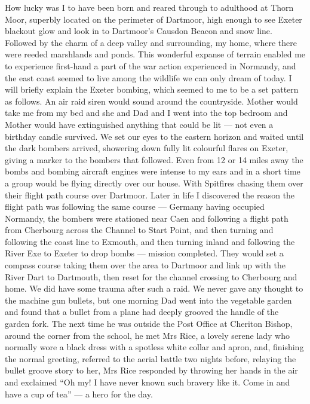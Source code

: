 
How lucky was I to have been born and reared through to adulthood at Thorn Moor,
superbly located on the perimeter of Dartmoor, high enough to see Exeter
blackout glow and look in to Dartmoor's Causdon Beacon and snow line. Followed
by the charm of a deep valley and surrounding, my home, where there were reeded
marshlands and ponds. This wonderful expanse of terrain enabled me to
experience first-hand a part of the war action experienced in Normandy, and the
east coast seemed to live among the wildlife we can only dream of today. I will
briefly explain the Exeter bombing, which seemed to me to be a set pattern as
follows. An air raid siren would sound around the countryside. Mother would
take me from my bed and she and Dad and I went into the top bedroom and Mother
would have extinguished anything that could be lit --- not even a birthday
candle survived. We set our eyes to the eastern horizon and waited until the
dark bombers arrived, showering down fully lit colourful flares on Exeter,
giving a marker to the bombers that followed. Even from 12 or 14 miles away the
bombs and bombing aircraft engines were intense to my ears and in a short time
a group would be flying directly over our house. With Spitfires chasing them
over their flight path course over Dartmoor. Later in life I discovered the
reason the flight path was following the same course --- Germany having
occupied Normandy, the bombers were stationed near Caen and following a flight
path from Cherbourg across the Channel to Start Point, and then turning and
following the coast line to Exmouth, and then turning inland and following the
River Exe to Exeter to drop bombs --- mission completed. They would set a
compass course taking them over the area to Dartmoor and link up with the River
Dart to Dartmouth, then reset for the channel crossing to Cherbourg and home.
We did have some trauma after such a raid. We never gave any thought to the
machine gun bullets, but one morning Dad went into the vegetable garden and
found that a bullet from a plane had deeply grooved the handle of the garden
fork. The next time he was outside the Post Office at Cheriton Bishop, around
the corner from the school, he met Mrs Rice, a lovely serene lady who normally
wore a black dress with a spotless white collar and apron, and, finishing the
normal greeting, referred to the aerial battle two nights before, relaying
the bullet groove story to her, Mrs Rice responded by throwing her hands in the
air and exclaimed ``Oh my! I have never known such bravery like it. Come in and
have a cup of tea'' --- a hero for the day.

